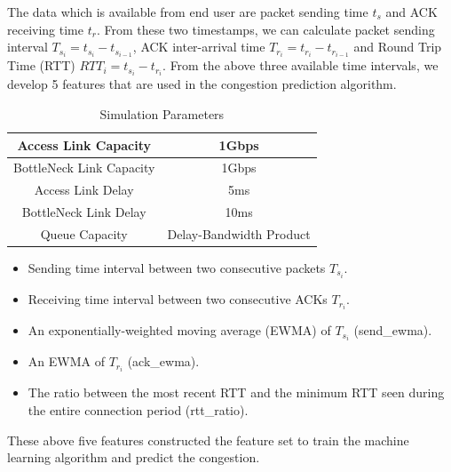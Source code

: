 \par The data which is available from end user are packet sending time $t_{s}$ and ACK receiving time $t_{r}$. From these two timestamps, we can calculate packet sending interval $T_{s_{i}} = t_{s_{i}} - t_{s_{i-1}}$, ACK inter-arrival time $T_{r_{i}} = t_{r_{i}} - t_{r_{i-1}}$ and Round Trip Time (RTT) $RTT_{i} = t_{s_{i}} - t_{r_{i}}$. From the above three available time intervals, we develop 5 features that are used in the congestion prediction algorithm.
\begin{table}
\begin{center}
\caption {Simulation Parameters} \label{tab:simuPara}
\begin{tabular}{ |c|c| }
 \hline
 Access Link Capacity & 1Gbps  \\
 \hline
 BottleNeck Link Capacity & 1Gbps  \\
 \hline
 Access Link Delay & 5ms  \\
 \hline
 BottleNeck Link Delay & 10ms\\
 \hline
 Queue Capacity & Delay-Bandwidth Product\\
 \hline
\end{tabular}
\end{center}
\end{table}
\begin{itemize}
\item Sending time interval between two consecutive packets $T_{s_{i}}$.
\item Receiving time interval between two consecutive ACKs $T_{r_{i}}$.
\item An exponentially-weighted moving average (EWMA) of $T_{s_{i}}$ (send\_ewma).
\item An EWMA of $T_{r_{i}}$ (ack\_ewma).
\item The ratio between the most recent RTT and the minimum RTT seen during the entire connection period (rtt\_ratio).
\end{itemize}

These above five features constructed the feature set to train the machine learning algorithm and predict the congestion.

